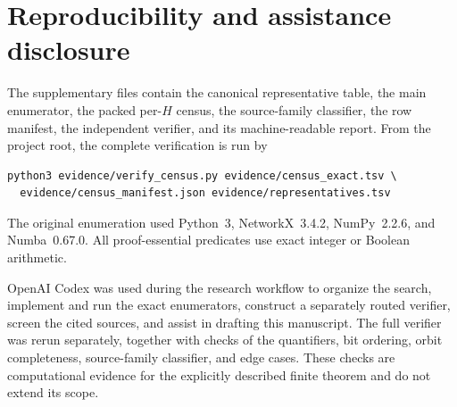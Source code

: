 \documentclass[11pt]{article}
\begin{document}
\section{Reproducibility and assistance disclosure}

The supplementary files contain the canonical representative table, the main
enumerator, the packed per-$H$ census, the source-family classifier, the row
manifest, the independent verifier, and its machine-readable report.  From the
project root, the complete verification is run by
\begin{verbatim}
python3 evidence/verify_census.py evidence/census_exact.tsv \
  evidence/census_manifest.json evidence/representatives.tsv
\end{verbatim}
The original enumeration used Python~3, NetworkX~3.4.2, NumPy~2.2.6, and
Numba~0.67.0.  All proof-essential predicates use exact integer or Boolean
arithmetic.

OpenAI Codex was used during the research workflow to organize the search,
implement and run the exact enumerators, construct a separately routed
verifier, screen the cited sources, and assist in drafting this manuscript.
The full verifier was rerun separately, together with checks of the
quantifiers, bit ordering, orbit completeness, source-family classifier, and
edge cases.  These checks are computational evidence for the explicitly
described finite theorem and do not extend its scope.



\end{document}
